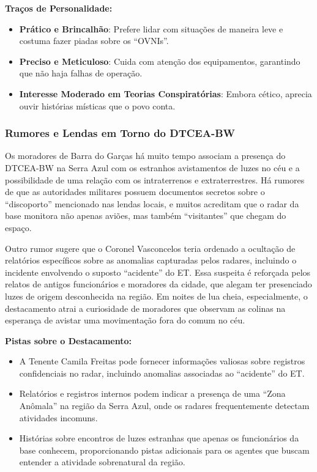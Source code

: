 \textbf{Traços de Personalidade:}
\begin{itemize}
    \item \textbf{Prático e Brincalhão}: Prefere lidar com situações de maneira leve e costuma fazer piadas sobre os “OVNIs”.
    \item \textbf{Preciso e Meticuloso}: Cuida com atenção dos equipamentos, garantindo que não haja falhas de operação.
    \item \textbf{Interesse Moderado em Teorias Conspiratórias}: Embora cético, aprecia ouvir histórias místicas que o povo conta.
\end{itemize}

\subsubsection{Rumores e Lendas em Torno do DTCEA-BW}

Os moradores de Barra do Garças há muito tempo associam a presença do DTCEA-BW na Serra Azul com os estranhos avistamentos de luzes no céu e a possibilidade de uma relação com os intraterrenos e extraterrestres. Há rumores de que as autoridades militares possuem documentos secretos sobre o ``discoporto'' mencionado nas lendas locais, e muitos acreditam que o radar da base monitora não apenas aviões, mas também ``visitantes'' que chegam do espaço. 

Outro rumor sugere que o Coronel Vasconcelos teria ordenado a ocultação de relatórios específicos sobre as anomalias capturadas pelos radares, incluindo o incidente envolvendo o suposto “acidente” do ET. Essa suspeita é reforçada pelos relatos de antigos funcionários e moradores da cidade, que alegam ter presenciado luzes de origem desconhecida na região. Em noites de lua cheia, especialmente, o destacamento atrai a curiosidade de moradores que observam as colinas na esperança de avistar uma movimentação fora do comum no céu.

\textbf{Pistas sobre o Destacamento:}
\begin{itemize}
    \item A Tenente Camila Freitas pode fornecer informações valiosas sobre registros confidenciais no radar, incluindo anomalias associadas ao “acidente” do ET.
    \item Relatórios e registros internos podem indicar a presença de uma “Zona Anômala” na região da Serra Azul, onde os radares frequentemente detectam atividades incomuns.
    \item Histórias sobre encontros de luzes estranhas que apenas os funcionários da base conhecem, proporcionando pistas adicionais para os agentes que buscam entender a atividade sobrenatural da região.
\end{itemize}


